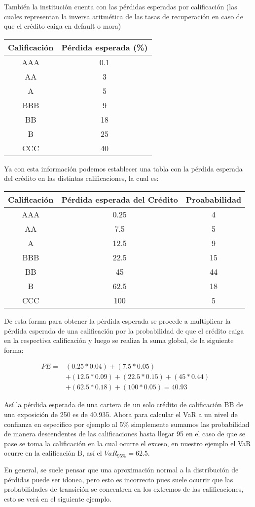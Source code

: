 \documentclass[
  12pt,
]{krantz}
\theoremstyle{definition}
\theoremstyle{definition}
\theoremstyle{definition}
\theoremstyle{remark}
\begin{document}
También la institución cuenta con las pérdidas esperadas por calificación (las cuales representan la inversa aritmética de las tasas de recuperación en caso de que el crédito caiga en default o mora)

\begin{longtable}[]{@{}cc@{}}
\toprule
Calificación & Pérdida esperada (\%)\tabularnewline
\midrule
\endhead
AAA & 0.1\tabularnewline
AA & 3\tabularnewline
A & 5\tabularnewline
BBB & 9\tabularnewline
BB & 18\tabularnewline
B & 25\tabularnewline
CCC & 40\tabularnewline
\bottomrule
\end{longtable}

Ya con esta información podemos establecer una tabla con la pérdida esperada del crédito en las distintas calificaciones, la cual es:

\begin{longtable}[]{@{}ccc@{}}
\toprule
Calificación & Pérdida esperada del Crédito & Proababilidad\tabularnewline
\midrule
\endhead
AAA & 0.25 & 4\tabularnewline
AA & 7.5 & 5\tabularnewline
A & 12.5 & 9\tabularnewline
BBB & 22.5 & 15\tabularnewline
BB & 45 & 44\tabularnewline
B & 62.5 & 18\tabularnewline
CCC & 100 & 5\tabularnewline
\bottomrule
\end{longtable}

De esta forma para obtener la pérdida esperada se procede a multiplicar la pérdida esperada de una calificación por la probabilidad de que el crédito caiga en la respectiva calificación y luego se realiza la suma global, de la siguiente forma:

\begin{align*} 
PE =& (0.25*0.04)+(7.5*0.05)& \\
&+(12.5*0.09)+(22.5*0.15)+(45*0.44)\\
&+(62.5*0.18) +(100*0.05)=40.93
\end{align*}

Así la pérdida esperada de una cartera de un solo crédito de calificación BB de una exposición de 250 es de 40.935. Ahora para calcular el VaR a un nivel de confianza en especifico por ejemplo al 5\% simplemente sumamos las probabilidad de manera descendentes de las calificaciones hasta llegar 95 en el caso de que se pase se toma la calificación en la cual ocurre el exceso, en nuestro ejemplo el VaR ocurre en la calificación B, así el \(VaR_{95\%}=62.5\).

En general, se suele pensar que una aproximación normal a la distribución de pérdidas puede ser idonea, pero esto es incorrecto pues suele ocurrir que las probabilidades de transición se concentren en los extremos de las calificaciones, esto se verá en el siguiente ejemplo.
\end{document}
